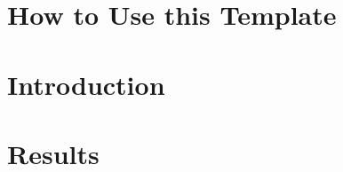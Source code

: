 \documentclass[journal,article,submit,moreauthors,pdftex]{Definitions/mdpi}
\begin{document}

\setcounter{section}{-1} %
\section{How to Use this Template}

\section{Introduction}
 
\section{Results}
\end{document}
